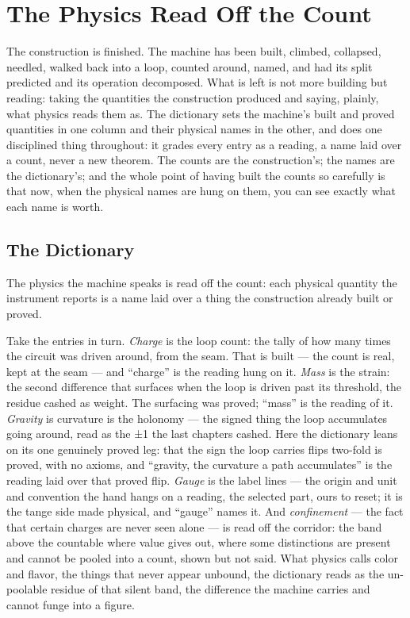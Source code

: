 \chapter{The Physics Read Off the Count}

The construction is finished. The machine has been built, climbed, collapsed, needled, walked back into a loop,
counted around, named, and had its split predicted and its operation decomposed. What is left is not more building
but reading: taking the quantities the construction produced and saying, plainly, what physics reads them as. The
dictionary sets the machine's built and proved quantities in one column and their physical names
in the other, and does one disciplined thing throughout: it grades every entry as a reading, a name laid
over a count, never a new theorem. The counts are the construction's; the names are the dictionary's; and the
whole point of having built the counts so carefully is that now, when the physical names are hung on them, you can
see exactly what each name is worth.

\section{The Dictionary}

The physics the machine speaks is read off the count: each physical quantity the instrument reports is a name
laid over a thing the construction already built or proved.

Take the entries in turn. \emph{Charge} is the loop count: the tally of how many times the circuit was driven
around, from the seam. That is built --- the count is real, kept at the seam --- and ``charge'' is the reading
hung on it. \emph{Mass} is the strain: the second difference that surfaces when the loop is driven past its
threshold, the residue cashed as weight. The surfacing was proved; ``mass'' is the reading of it. \emph{Gravity}
is curvature is the holonomy --- the signed thing the loop accumulates going around, read as the ±1 the last
chapters cashed. Here the dictionary leans on its one genuinely proved leg: that the sign the loop carries flips
two-fold is proved, with no axioms, and ``gravity, the curvature a path accumulates'' is the reading laid over
that proved flip. \emph{Gauge} is the label lines --- the origin and unit and convention the hand hangs on a
reading, the selected part, ours to reset; it is the tange side made physical, and ``gauge'' names it. And
\emph{confinement} --- the fact that certain charges are never seen alone --- is read off the corridor: the band
above the countable where value gives out, where some distinctions are present and cannot be pooled into a count,
shown but not said. What physics calls color and flavor, the things that never appear unbound, the dictionary
reads as the un-poolable residue of that silent band, the difference the machine carries and cannot funge into a
figure.

